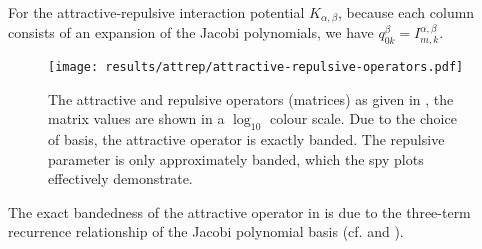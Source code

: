 For the attractive-repulsive interaction potential $K_{\alpha,\beta}$, because each column consists of an expansion of the Jacobi polynomials, we have $q^{\beta}_{0k} = I_{m,k}^{\alpha,\beta}$.

\begin{figure}[H]
  \centering
  \texttt{[image: results/attrep/attractive-repulsive-operators.pdf]}
  \caption[Attractive and repulsive operators.]{The attractive and repulsive operators (matrices) as given in , the matrix values are shown in a $\log_{10}$ colour scale. Due to the choice of basis, the attractive operator is exactly banded. The repulsive parameter is only approximately banded, which the spy plots effectively demonstrate.}
  \label{fig:attractive-repulsive}
\end{figure}

The exact bandedness of the attractive operator in  is due to the three-term recurrence relationship of the Jacobi polynomial basis (cf.  and ).
